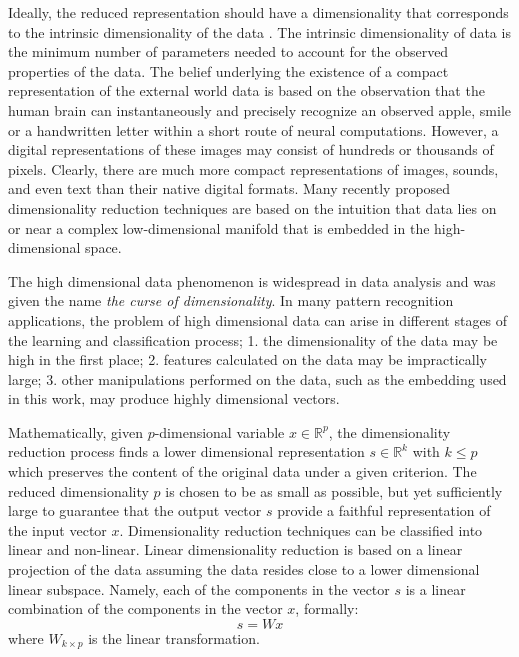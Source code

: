 \iftoggle{edit-mode}{\hspace{0pt}\marginpar{data Intrinsic dimensionality}}{}
Ideally, the reduced representation should have a dimensionality that corresponds to the intrinsic dimensionality of the data \cite{van2009dimensionality}.
The intrinsic dimensionality of data is the minimum number of parameters needed to account for the observed properties of the data. 
The belief underlying the existence of a compact representation of the external world data is based on the observation that the human brain can instantaneously and precisely recognize an observed apple, smile or a handwritten letter within a short route of neural computations. 
However, a digital representations of these images may consist of hundreds or thousands of pixels. 
Clearly, there are much more compact representations of images, sounds, and even text than their native digital formats. 
Many recently proposed dimensionality reduction techniques are based on the intuition that data lies on or near a complex low-dimensional manifold that is embedded in the high-dimensional space.

\iftoggle{edit-mode}{\hspace{0pt}\marginpar{The curse of dimensionality}}{}
The high dimensional data phenomenon is widespread in data analysis and was given the name \emph{the curse of dimensionality}. 
In many pattern recognition applications, the problem of high dimensional data can arise in different stages of the learning and classification process; 1. the dimensionality of the data may be high in the first place; 2. features calculated on the data may be impractically large; 3. other manipulations performed on the data, such as the embedding used in this work, may produce highly dimensional vectors.

\iftoggle{edit-mode}{\hspace{0pt}\marginpar{Mathematical Definition}}{}
Mathematically, given $p$-dimensional variable $x \in \mathds{R}^p$, the dimensionality reduction process finds a lower dimensional representation $s \in \mathds{R}^k$ with $k \leq p$ which preserves the content of the original data under a given criterion. 
The reduced dimensionality $p$ is chosen to be as small as possible, but yet sufficiently large to guarantee that the output vector $s$ provide a faithful representation of the input vector $x$. 
Dimensionality reduction techniques can be classified into linear and non-linear. Linear dimensionality reduction is based on a linear projection of the data assuming the data resides close to a lower dimensional linear subspace. 
Namely, each of the components in the vector $s$ is a linear combination of the components in the vector $x$, formally:
\begin{equation}
s=Wx
\end{equation}
where $W_{k \times p}$ is the linear transformation.

